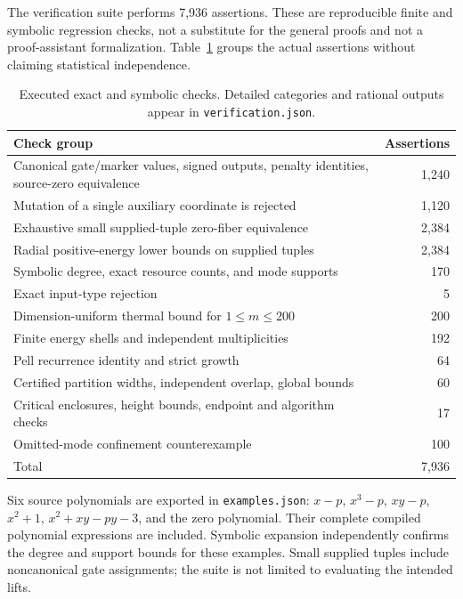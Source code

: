 \documentclass[11pt,letterpaper]{article}
\theoremstyle{definition}
\theoremstyle{remark}
\begin{document}
The verification suite performs 7,936 assertions. These are reproducible finite and symbolic regression checks, not a substitute for the general proofs and not a proof-assistant formalization. Table~\ref{ste:ta:tab:tests} groups the actual assertions without claiming statistical independence.
\begin{table}[ht]
\centering\small
\begin{tabular}{p{}r}
\toprule
Check group & Assertions\\
\midrule
Canonical gate/marker values, signed outputs, penalty identities, source-zero equivalence & 1,240\\
Mutation of a single auxiliary coordinate is rejected & 1,120\\
Exhaustive small supplied-tuple zero-fiber equivalence & 2,384\\
Radial positive-energy lower bounds on supplied tuples & 2,384\\
Symbolic degree, exact resource counts, and mode supports & 170\\
Exact input-type rejection & 5\\
Dimension-uniform thermal bound for $1\le m\le200$ & 200\\
Finite energy shells and independent multiplicities & 192\\
Pell recurrence identity and strict growth & 64\\
Certified partition widths, independent overlap, global bounds & 60\\
Critical enclosures, height bounds, endpoint and algorithm checks & 17\\
Omitted-mode confinement counterexample & 100\\
\midrule
Total & 7,936\\
\bottomrule
\end{tabular}
\caption{Executed exact and symbolic checks. Detailed categories and rational outputs appear in \texttt{verification.json}.}\label{ste:ta:tab:tests}
\end{table}

Six source polynomials are exported in \texttt{examples.json}: $x-p$, $x^3-p$, $xy-p$, $x^2+1$, $x^2+xy-py-3$, and the zero polynomial. Their complete compiled polynomial expressions are included. Symbolic expansion independently confirms the degree and support bounds for these examples. Small supplied tuples include noncanonical gate assignments; the suite is not limited to evaluating the intended lifts.
\end{document}
